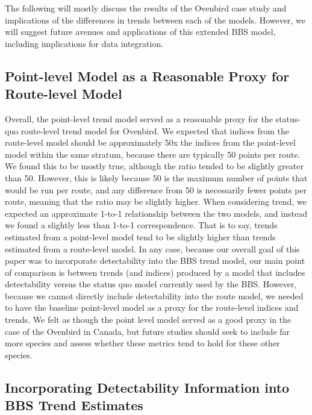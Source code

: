 \documentclass[12pt]{article}
\begin{document}
\par The following will mostly discuss the results of the Ovenbird case study and implications of the differences in trends between each of the models.
However, we will suggest future avenues and applications of this extended BBS model, including implications for data integration.

\subsection{Point-level Model as a Reasonable Proxy for Route-level Model}

\par Overall, the point-level trend model served as a reasonable proxy for the status-quo route-level trend model for Ovenbird.
We expected that indices from the route-level model should be approximately 50x the indices from the point-level model within the same stratum, because there are typically 50 points per route.
We found this to be mostly true, although the ratio tended to be slightly greater than 50.
However, this is likely because 50 is the maximum number of points that would be run per route, and any difference from 50 is necessarily fewer points per route, meaning that the ratio may be slightly higher.
When considering trend, we expected an approximate 1-to-1 relationship between the two models, and instead we found a slightly less than 1-to-1 correspondence.
That is to say, trends estimated from a point-level model tend to be slightly higher than trends estimated from a route-level model.
In any case, because our overall goal of this paper was to incorporate detectability into the BBS trend model, our main point of comparison is between trends (and indices) produced by a model that includes detectability versus the status quo model currently used by the BBS.
However, because we cannot directly include detectability into the route model, we needed to have the baseline point-level model as a proxy for the route-level indices and trends.
We felt as though the point level model served as a good proxy in the case of the Ovenbird in Canada, but future studies should seek to include far more species and assess whether these metrics tend to hold for these other species. 

\subsection{Incorporating Detectability Information into BBS Trend Estimates}
\end{document}
